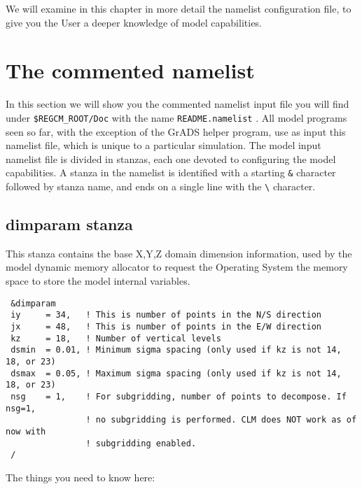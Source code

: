 %
%

We will examine in this chapter in more detail the namelist configuration file,
to give you the User a deeper knowledge of model capabilities.

\section{The commented namelist}

In this section we will show you the commented namelist input file you will
find under \verb=$REGCM_ROOT/Doc= with the name \verb=README.namelist= .
All model programs seen so far, with the exception of the GrADS helper program,
use as input this namelist file, which is unique to a particular simulation.
The model input namelist file is divided in stanzas, each one devoted to
configuring the model capabilities.
A stanza in the namelist is identified with a starting \verb=&= character
followed by stanza name, and ends on a single line with the \verb=\=
character.

\subsection{dimparam stanza}
\label{dimparam}

This stanza contains the base X,Y,Z domain dimension information, used
by the model dynamic memory allocator to request the Operating System the
memory space to store the model internal variables.

{\footnotesize
\begin{Verbatim}
 &dimparam
 iy     = 34,   ! This is number of points in the N/S direction
 jx     = 48,   ! This is number of points in the E/W direction
 kz     = 18,   ! Number of vertical levels
 dsmin  = 0.01, ! Minimum sigma spacing (only used if kz is not 14, 18, or 23)
 dsmax  = 0.05, ! Maximum sigma spacing (only used if kz is not 14, 18, or 23)
 nsg    = 1,    ! For subgridding, number of points to decompose. If nsg=1,
                ! no subgridding is performed. CLM does NOT work as of now with
                ! subgridding enabled.
 /
\end{Verbatim}
}

The things you need to know here:

